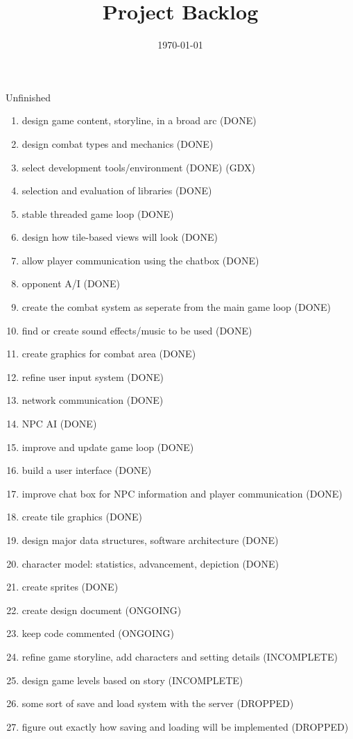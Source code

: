 \documentclass[12pt]{article}
\title{Project Backlog}
\date{\today}
\begin{document}
\maketitle

\begin{section}{Unfinished}
\begin{enumerate}



\item design game content, storyline, in a broad arc (DONE)
\item design combat types and mechanics (DONE)
\item select development tools/environment (DONE) (GDX)
\item selection and evaluation of libraries (DONE)
\item stable threaded game loop (DONE)
\item design how tile-based views will look (DONE)


\item allow player communication using the chatbox (DONE)
\item opponent A/I (DONE)
\item create the combat system as seperate from the main game loop (DONE)
\item find or create sound effects/music to be used (DONE)
\item create graphics for combat area (DONE)
\item refine user input system (DONE)
\item network communication (DONE)
\item NPC AI (DONE)
\item improve and update game loop (DONE)
\item build a user interface (DONE)
\item improve chat box for NPC information and player communication (DONE)
\item create tile graphics (DONE)
\item design major data structures, software architecture  (DONE) 
\item character model: statistics, advancement, depiction (DONE)
\item create sprites (DONE)

\item create design document (ONGOING)
\item keep code commented (ONGOING)
	
	
\item refine game storyline, add characters and setting details (INCOMPLETE)
\item design game levels based on story (INCOMPLETE)


\item some sort of save and load system with the server (DROPPED) 
\item figure out exactly how saving and loading will be implemented (DROPPED)


\end{enumerate}
\end{section}
\end{document}
